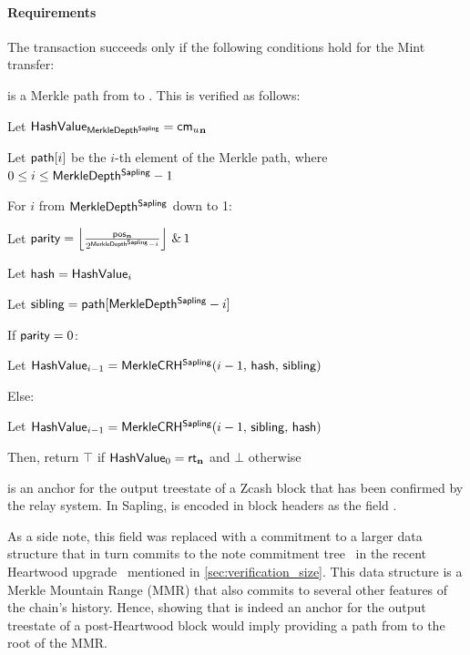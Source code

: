 \paragraph{Requirements}
The \mint transaction succeeds only if the following conditions hold for the Mint transfer:
\begin{itemize}
    \item \pthn is a Merkle path from \cmun to \rtn.
    This is verified as follows:
    \begin{alg}
        \item Let $\mathsf{HashValue}_{\mathsf{MerkleDepth^{Sapling}}} = \mathsf{{cm_{\mathnormal{u}}}_{\mathbf{n}}}$
        \item Let $\mathsf{path}[i]$ be the $i$-th element of the Merkle path, where $0 \leq i \leq \mathsf{MerkleDepth^{Sapling}} - 1$
        \item For $i$ from $\mathsf{MerkleDepth^{Sapling}}$ down to 1:
        \begin{alg}
            \item Let $\parity = \left \lfloor{\frac{\posn}{2^{\mds - i}}}\right \rfloor \,\&\, 1$
            \item Let $\mathsf{hash} = \mathsf{HashValue}_{i}$
            \item Let $\mathsf{sibling} = \mathsf{path}[\mathsf{MerkleDepth^{Sapling}} - i]$
            \item If $\mathsf{parity} = 0$:
            \begin{alg}
                \item Let $\mathsf{HashValue}_{i-1} = \mathsf{MerkleCRH^{Sapling}}(i - 1,\, \mathsf{hash},\, \mathsf{sibling})$
            \end{alg}
            \item Else:
            \begin{alg}
                \item Let $\mathsf{HashValue}_{i-1} = \mathsf{MerkleCRH^{Sapling}}(i - 1,\, \mathsf{sibling},\, \mathsf{hash})$
            \end{alg}
        \end{alg}
        \item Then, return $\top$ if $\mathsf{HashValue}_{0} = \mathsf{rt_{\mathbf{n}}}$ and $\bot$ otherwise
    \end{alg}

    \item \rtn is an anchor for the output treestate of a Zcash block that has been confirmed by the relay system.
    In Sapling, \rtn is encoded in block headers as the field \hfsr.
    
    As a side note, this field was replaced with a commitment to a larger data structure that in turn commits to the note commitment tree~\cite{zipszip0221flyclient} in the recent Heartwood upgrade~\cite{HeartwoodZcash} mentioned in \cref{sec:verification_size}.
    This data structure is a Merkle Mountain Range (MMR) that also commits to several other features of the chain's history.
    Hence, showing that \rtn is indeed an anchor for the output treestate of a post-Heartwood block would imply providing a path from \rtn to the root of the MMR.


\end{itemize}
